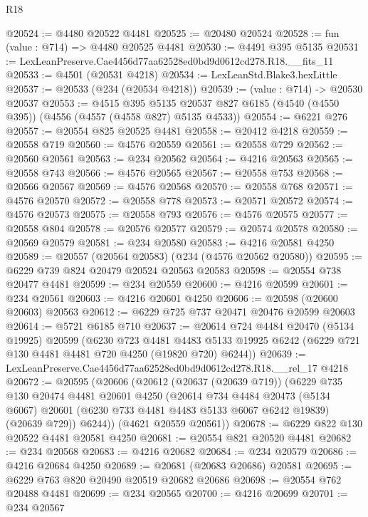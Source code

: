 \begin{lexlean}{R18}
\begin{coremodule}
@20524 := @4480 @20522 @4481
@20525 := @20480 @20524
@20528 := fun (value : @714) => @4480 @20525 @4481
@20530 := @4491 @395 @5135
@20531 := LexLeanPreserve.Cae4456d77aa62528ed0bd9d0612cd278.R18.__fits_11
@20533 := @4501 (@20531 @4218)
@20534 := LexLeanStd.Blake3.hexLittle
@20537 := @20533 (@234 (@20534 @4218))
@20539 := (value : @714) -> @20530 @20537
@20553 := @4515
    @395
    @5135
    @20537
    @827
    @6185
    (@4540 (@4550 @395))
    (@4556 (@4557 (@4558 @827) @5135 @4533))
@20554 := @6221 @276
@20557 := @20554 @825 @20525 @4481
@20558 := @20412 @4218
@20559 := @20558 @719
@20560 := @4576 @20559
@20561 := @20558 @729
@20562 := @20560 @20561
@20563 := @234 @20562
@20564 := @4216 @20563
@20565 := @20558 @743
@20566 := @4576 @20565
@20567 := @20558 @753
@20568 := @20566 @20567
@20569 := @4576 @20568
@20570 := @20558 @768
@20571 := @4576 @20570
@20572 := @20558 @778
@20573 := @20571 @20572
@20574 := @4576 @20573
@20575 := @20558 @793
@20576 := @4576 @20575
@20577 := @20558 @804
@20578 := @20576 @20577
@20579 := @20574 @20578
@20580 := @20569 @20579
@20581 := @234 @20580
@20583 := @4216 @20581 @4250
@20589 := @20557 (@20564 @20583) (@234 (@4576 @20562 @20580))
@20595 := @6229 @739 @824 @20479 @20524 @20563 @20583
@20598 := @20554 @738 @20477 @4481
@20599 := @234 @20559
@20600 := @4216 @20599
@20601 := @234 @20561
@20603 := @4216 @20601 @4250
@20606 := @20598 (@20600 @20603) @20563
@20612 := @6229 @725 @737 @20471 @20476 @20599 @20603
@20614 := @5721 @6185 @710
@20637 := @20614
    @724
    @4484
    @20470
    (@5134 @19925)
    @20599
    (@6230
      @723
      @4481
      @4483
      @5133
      @19925
      @6242
      (@6229 @721 @130 @4481 @4481 @720 @4250 (@19820 @720) @6244))
@20639 := LexLeanPreserve.Cae4456d77aa62528ed0bd9d0612cd278.R18.__rel_17 @4218
@20672 := @20595
    (@20606
      (@20612
        (@20637 (@20639 @719))
        (@6229
          @735
          @130
          @20474
          @4481
          @20601
          @4250
          (@20614
            @734
            @4484
            @20473
            (@5134 @6067)
            @20601
            (@6230 @733 @4481 @4483 @5133 @6067 @6242 @19839)
            (@20639 @729))
          @6244))
      (@4621 @20559 @20561))
@20678 := @6229 @822 @130 @20522 @4481 @20581 @4250
@20681 := @20554 @821 @20520 @4481
@20682 := @234 @20568
@20683 := @4216 @20682
@20684 := @234 @20579
@20686 := @4216 @20684 @4250
@20689 := @20681 (@20683 @20686) @20581
@20695 := @6229 @763 @820 @20490 @20519 @20682 @20686
@20698 := @20554 @762 @20488 @4481
@20699 := @234 @20565
@20700 := @4216 @20699
@20701 := @234 @20567

\end{coremodule}
\end{lexlean}
